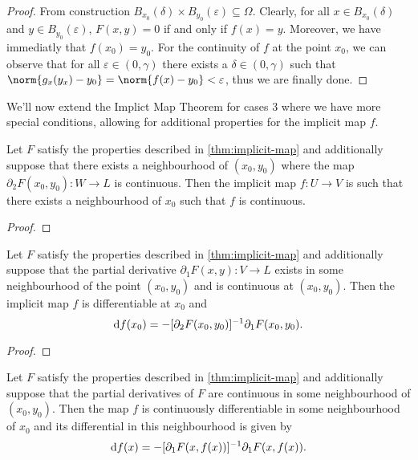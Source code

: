 \begin{proof}
From construction \(B_{x_0}(\delta) \times B_{y_0}(\varepsilon) \subseteq \Omega\). Clearly, for all \(x \in
B_{x_0}(\delta)\) and \(y \in B_{y_0}(\varepsilon)\), \(F(x, y) = 0\) if and only if \(f(x) =
y\). Moreover, we have immediatly that \(f(x_0) = y_0\). For the continuity of
\(f\) at the point \(x_0\), we can observe that for all \(\varepsilon \in (0, \gamma)\) there
exists a \(\delta \in (0, \gamma)\) such that \(\norm{g_x(y_x) - y_0} = \norm{f(x) - y_0}
< \varepsilon\), thus we are finally done.
\end{proof}

We'll now extend the Implict Map Theorem for cases 3 where we have more
special conditions, allowing for additional properties for the implicit map
\(f\).

\begin{lemma}
\label{lem:continuity-implicit-map}
Let \(F\) satisfy the properties described in \cref{thm:implicit-map} and
additionally suppose that there exists a neighbourhood of \((x_0, y_0)\) where
the map \(\partial_2F(x_0, y_0): W \to L\) is continuous. Then the implicit map \(f: U
\to V\) is such that there exists a neighbourhood of \(x_0\) such that \(f\) is
continuous.
\end{lemma}

\begin{proof}

\end{proof}


\begin{lemma}
\label{lem:differential-implicit-map}
Let \(F\) satisfy the properties described in \cref{thm:implicit-map} and
additionally suppose that the partial derivative \(\partial_1F(x, y): V \to L\)
exists in some neighbourhood of the point \((x_0, y_0)\) and is continuous at
\((x_0, y_0)\). Then the implicit map \(f\) is differentiable at \(x_0\) and
\[
  \mathrm{d} f(x_0) = - [\partial_2F(x_0, y_0)]^{-1} \partial_1 F(x_{0}, y_0).
\]
\end{lemma}

\begin{proof}

\end{proof}

\begin{lemma}
\label{lem:continuous-diff-implicit-map}
Let \(F\) satisfy the properties described in \cref{thm:implicit-map} and
additionally suppose that the partial derivatives of \(F\) are continuous in
some neighbourhood of \((x_0, y_0)\). Then the map \(f\) is continuously
differentiable in some neighbourhood of \(x_0\) and its differential in this
neighbourhood is given by
\[
  \mathrm{d} f(x) = - [\partial_1F(x, f(x))]^{-1} \partial_1F(x, f(x)).
\]
\end{lemma}

